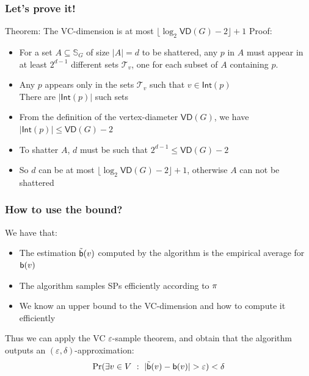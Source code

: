 \begin{frame}
  \frametitle{Let's prove it!}
  Theorem: The VC-dimension is at most $\lfloor\log_2\mathsf{VD}(G)
  -2\rfloor +1$
  \vfill
  Proof:
  \begin{itemize}
    \item For a set $A\subseteq\mathbb{S}_G$ of size $|A|=d$ to be
      shattered, any $p$ in $A$ must appear in at least $2^{d-1}$
      different sets $\mathcal{T}_v$, one for each subset of $A$
      containing $p$.
    \item Any $p$ appears only in the sets $\mathcal{T}_v$ such that
      $v\in\mathsf{Int}(p)$\\
      \quad There are $|\mathsf{Int}(p)|$ such sets
    \item From the definition of the vertex-diameter $\mathsf{VD}(G)$, we have
      $|\mathsf{Int}(p)|\le\mathsf{VD}(G)-2$
    \item To shatter $A$, $d$ must be such that $2^{d-1}\le\mathsf{VD}(G)-2$
    \item So $d$ can be at most $\lfloor\log_2\mathsf{VD}(G) -2\rfloor +1$,
      otherwise $A$ can not be shattered
  \end{itemize}
\end{frame}

\begin{frame}
  \frametitle{How to use the bound?}
  We have that:
  \begin{itemize}
    \item The estimation $\tilde{\mathsf{b}}(v)$ computed by the algorithm is the
      empirical average for $\mathsf{b}(v)$
    \item The algorithm samples SPs efficiently according to $\pi$
    \item We know an upper bound to the VC-dimension and how to compute it
      efficiently
  \end{itemize}
  Thus we can apply the VC $\varepsilon$-sample theorem, and obtain that the algorithm
  outputs an $(\varepsilon,\delta)$-approximation:
  \[
    \Pr(\exists v\in V ~:~ |\tilde{\betw}(v)-\betw(v)|>\varepsilon)<\delta
  \]
\end{frame}

